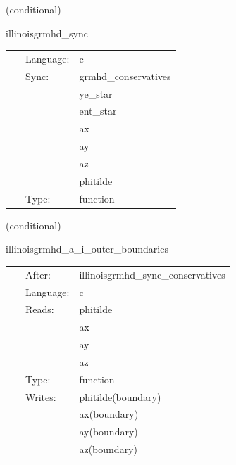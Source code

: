    (conditional) 

\hspace{5mm} illinoisgrmhd\_sync 

\hspace{5mm}{\it sync conservative variable ghost zones for c2p routine } 


\hspace{5mm}

 \begin{tabular*}{160mm}{cll} 
~ & Language:  & c \\ 
~ & Sync:  & grmhd\_conservatives \\ 
~& ~ &ye\_star\\ 
~& ~ &ent\_star\\ 
~& ~ &ax\\ 
~& ~ &ay\\ 
~& ~ &az\\ 
~& ~ &phitilde\\ 
~ & Type:  & function \\ 
\end{tabular*} 


\vspace{5mm}

   (conditional) 

\hspace{5mm} illinoisgrmhd\_a\_i\_outer\_boundaries 



\hspace{5mm}

 \begin{tabular*}{160mm}{cll} 
~ & After:  & illinoisgrmhd\_sync\_conservatives \\ 
~ & Language:  & c \\ 
~ & Reads:  & phitilde \\ 
~& ~ &ax\\ 
~& ~ &ay\\ 
~& ~ &az\\ 
~ & Type:  & function \\ 
~ & Writes:  & phitilde(boundary) \\ 
~& ~ &ax(boundary)\\ 
~& ~ &ay(boundary)\\ 
~& ~ &az(boundary)\\ 
\end{tabular*} 


